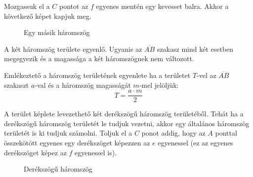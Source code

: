 \documentclass[11pt, a4paper]{article}
\begin{document}
Mozgassuk el a $C$ pontot az $f$ egyenes ment\'en egy kevesset balra. Akkor a következ\H{o} k\'epet kapjuk meg. 

\begin{figure}[h]
\centering
{}
\caption{Egy m\'asik h\'aromszög}
\label{fig:tri2}
\end{figure}

A k\'et h\'aromszög területe egyenl\H{o}. Ugyanis az $\overline{AB}$ szakasz mind k\'et esetben megegyezik \'es a magass\'aga a k\'et h\'aromszögnek nem v\'altozott.

Eml\'ekeztet\H{o} a h\'aromszög terület\'enek egyenlete ha a területet $T$-vel az $\overline{AB}$ szakaszt $a$-val \'es a h\'aromszög magass\'ag\'at $m$-mel jelöljük:
\[
    T=\frac{a\cdot m}{2}
\]

A terület k\'eplete levezethet\H{o} k\'et der\'ekszög\H{u} h\'aromszög terület\'eb\H{o}l. Teh\'at ha a der\'ekszög\H{u} h\'aromszög terület\'et le tudjuk vezetni, akkor egy \'altal\'anos h\'aromszög terület\'et is ki tudjuk sz\'amolni. Toljuk el a $C$ ponot addig, hogy az $A$ ponttal összekötött egyenes egy der\'ekszöget k\'epezzen az $e$ egyenessel (ez az egyenes der\'ekszöget k\'epez az $f$ egyenessel is).

\begin{figure}[h]
\centering
{}
\caption{Der\'ekszög\H{u} h\'aromszög}
\label{fig:tri3}
\end{figure}
\end{document}
